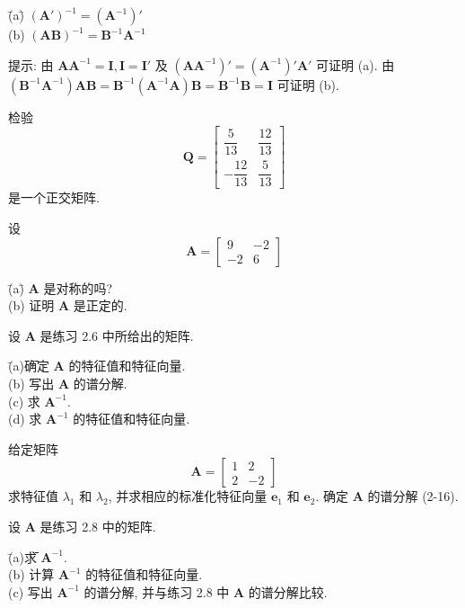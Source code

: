 \begin{tabbing}
\hspace*{2em}\=(a)\quad \= $(\mathbf{A}')^{-1}=(\mathbf{A}^{-1})'$\\[2pt]
\>(b)\> $(\mathbf{A}\mathbf{B})^{-1}=\mathbf{B}^{-1}\mathbf{A}^{-1}$
\end{tabbing}

\noindent 提示: 由 $\mathbf{A}\mathbf{A}^{-1}=\mathbf{I},\mathbf{I}=\mathbf{I}'$ 及 $(\mathbf{A}\mathbf{A}^{-1})'=(\mathbf{A}^{-1})'\mathbf{A}'$ 可证明 (a). 由 $(\mathbf{B}^{-1}\mathbf{A}^{-1})\mathbf{A}\mathbf{B}=\mathbf{B}^{-1}(\mathbf{A}^{-1}\mathbf{A})\mathbf{B}=\mathbf{B}^{-1}\mathbf{B}=\mathbf{I}$ 可证明 (b).

\medskip
{}\quad 检验
\[
\mathbf{Q}=\begin{bmatrix}\dfrac{5}{13}&\dfrac{12}{13}\\[6pt]-\dfrac{12}{13}&\dfrac{5}{13}\end{bmatrix}
\]
是一个正交矩阵.

\medskip
{}\quad 设
\[
\mathbf{A}=\begin{bmatrix}9&-2\\-2&6\end{bmatrix}
\]
\begin{tabbing}
\hspace*{2em}\=(a)\quad \= $\mathbf{A}$ 是对称的吗?\\[2pt]
\>(b)\> 证明 $\mathbf{A}$ 是正定的.
\end{tabbing}

\medskip
{}\quad 设 $\mathbf{A}$ 是练习 2.6 中所给出的矩阵.
\begin{tabbing}
\hspace*{2em}\=(a)\quad \= 确定 $\mathbf{A}$ 的特征值和特征向量.\\[2pt]
\>(b)\> 写出 $\mathbf{A}$ 的谱分解.\\[2pt]
\>(c)\> 求 $\mathbf{A}^{-1}$.\\[2pt]
\>(d)\> 求 $\mathbf{A}^{-1}$ 的特征值和特征向量.
\end{tabbing}

\medskip
{}\quad 给定矩阵
\[
\mathbf{A}=\begin{bmatrix}1&2\\2&-2\end{bmatrix}
\]
求特征值 $\lambda_{1}$ 和 $\lambda_{2}$, 并求相应的标准化特征向量 $\mathbf{e}_{1}$ 和 $\mathbf{e}_{2}$. 确定 $\mathbf{A}$ 的谱分解 (2-16).

\medskip
{}\quad 设 $\mathbf{A}$ 是练习 2.8 中的矩阵.
\begin{tabbing}
\hspace*{2em}\=(a)\quad \= 求 $\mathbf{A}^{-1}$.\\[2pt]
\>(b)\> 计算 $\mathbf{A}^{-1}$ 的特征值和特征向量.\\[2pt]
\>(c)\> 写出 $\mathbf{A}^{-1}$ 的谱分解, 并与练习 2.8 中 $\mathbf{A}$ 的谱分解比较.
\end{tabbing}

